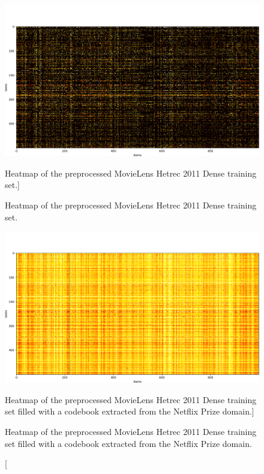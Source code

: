 \begin{figure}[htb]
  \centering
  \includegraphics[width=\textwidth]{pictures/movielens-target}
  \caption
  [Heatmap of the preprocessed MovieLens Hetrec 2011 Dense training set.]
  {\protect\raggedright Heatmap of the preprocessed MovieLens Hetrec 2011 Dense training set.}
  \includegraphics[width=\textwidth]{pictures/movielens-target-filled}
  \caption
  [Heatmap of the preprocessed MovieLens Hetrec 2011 Dense training set filled with a codebook extracted from the Netflix Prize domain.]
  {\protect\raggedright Heatmap of the preprocessed MovieLens Hetrec 2011 Dense training set filled with a codebook extracted from the Netflix Prize domain.}
\end{figure}


